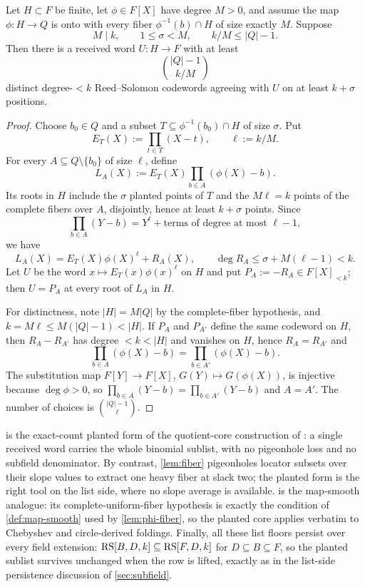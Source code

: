 \begin{corollary}\label{cor:v13-polyfold-planted}
Let $H\subset F$ be finite, let $\phi\in F[X]$ have degree $M>0$, and assume the map $\phi:H\to Q$ is onto with every fiber $\phi^{-1}(b)\cap H$ of size exactly $M$.  Suppose
\[
        M\mid k,
        \qquad
        1\le\sigma<M,
        \qquad
        k/M\le |Q|-1 .
\]
Then there is a received word $U:H\to F$ with at least
\[
        \binom{|Q|-1}{k/M}
\]
distinct degree-$<k$ Reed--Solomon codewords agreeing with $U$ on at least $k+\sigma$ positions.
\end{corollary}

\begin{proof}
Choose $b_0\in Q$ and a subset $T\subseteq \phi^{-1}(b_0)\cap H$ of size $\sigma$.  Put
\[
        E_T(X):=\prod_{t\in T}(X-t),
        \qquad
        \ell:=k/M.
\]
For every $A\subseteq Q\setminus\{b_0\}$ of size $\ell$, define
\[
        L_A(X):=E_T(X)\prod_{b\in A}(\phi(X)-b).
\]
Its roots in $H$ include the $\sigma$ planted points of $T$ and the $M\ell=k$ points of the complete fibers over $A$, disjointly, hence at least $k+\sigma$ points.  Since
\[
        \prod_{b\in A}(Y-b)=Y^\ell+\text{terms of degree at most }\ell-1,
\]
we have
\[
        L_A(X)=E_T(X)\phi(X)^\ell+R_A(X),
        \qquad
        \deg R_A\le \sigma+M(\ell-1)<k.
\]
Let $U$ be the word $x\mapsto E_T(x)\phi(x)^\ell$ on $H$ and put $P_A:=-R_A\in F[X]_{<k}$; then $U=P_A$ at every root of $L_A$ in $H$.

For distinctness, note $|H|=M|Q|$ by the complete-fiber hypothesis, and $k=M\ell\le M(|Q|-1)<|H|$.  If $P_A$ and $P_{A'}$ define the same codeword on $H$, then $R_A-R_{A'}$ has degree $<k<|H|$ and vanishes on $H$, hence $R_A=R_{A'}$ and
\[
        \prod_{b\in A}(\phi(X)-b)=\prod_{b\in A'}(\phi(X)-b).
\]
The substitution map $F[Y]\to F[X]$, $G(Y)\mapsto G(\phi(X))$, is injective because $\deg\phi>0$, so $\prod_{b\in A}(Y-b)=\prod_{b\in A'}(Y-b)$ and $A=A'$.  The number of choices is $\binom{|Q|-1}{\ell}$.
\end{proof}

\begin{remark}\label{rem:v13-planted-v12}
 is the exact-count planted form of the quotient-core construction of \cite{Cho26b}: a single received word carries the whole binomial sublist, with no pigeonhole loss and no subfield denominator.  By contrast, \cref{lem:fiber} pigeonholes locator subsets over their slope values to extract one heavy fiber at slack two; the planted form is the right tool on the list side, where no slope average is available.   is the map-smooth analogue: its complete-uniform-fiber hypothesis is exactly the condition of \cref{def:map-smooth} used by \cref{lem:phi-fiber}, so the planted core applies verbatim to Chebyshev and circle-derived foldings.  Finally, all these list floors persist over every field extension: $\mathrm{RS}[B,D,k]\subseteq\mathrm{RS}[F,D,k]$ for $D\subseteq B\subseteq F$, so the planted sublist survives unchanged when the row is lifted, exactly as in the list-side persistence discussion of \cref{sec:subfield}.
\end{remark}

